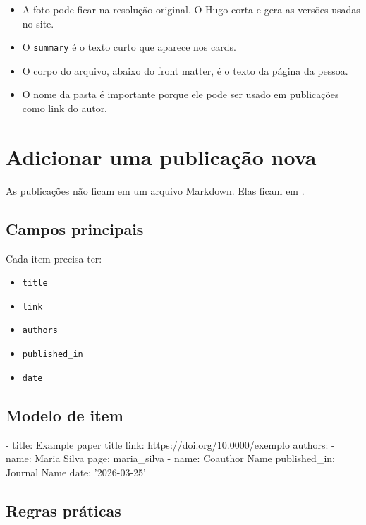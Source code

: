 \documentclass[11pt,a4paper]{article}
\begin{document}
\begin{itemize}
  \item A foto pode ficar na resolução original. O Hugo corta e gera as versões usadas no site.
  \item O \texttt{summary} é o texto curto que aparece nos cards.
  \item O corpo do arquivo, abaixo do front matter, é o texto da página da pessoa.
  \item O nome da pasta é importante porque ele pode ser usado em publicações como link do autor.
\end{itemize}

\section{Adicionar uma publicação nova}

As publicações não ficam em um arquivo Markdown. Elas ficam em .

\subsection{Campos principais}

Cada item precisa ter:

\begin{itemize}
  \item \texttt{title}
  \item \texttt{link}
  \item \texttt{authors}
  \item \texttt{published\_in}
  \item \texttt{date}
\end{itemize}

\subsection{Modelo de item}

\begin{terminal}
- title: Example paper title
  link: https://doi.org/10.0000/exemplo
  authors:
  - name: Maria Silva
    page: maria_silva
  - name: Coauthor Name
  published_in: Journal Name
  date: '2026-03-25'
\end{terminal}

\subsection{Regras práticas}
\end{document}
